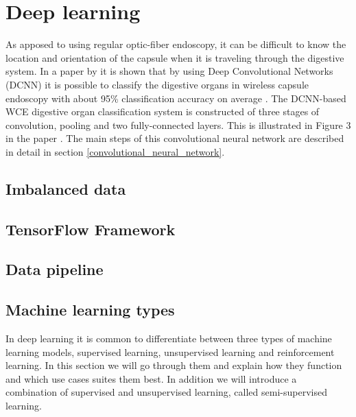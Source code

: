 \documentclass[thesis.tex]{subfiles}
\begin{document}



\section{Deep learning} \label{sec:deep_learning}
As apposed to using regular optic-fiber endoscopy, it can be difficult to know the location and orientation of the capsule when it is traveling through the digestive system. In a paper by \citeauthor*{ClassifyingDigestive15} it is shown that by using Deep Convolutional Networks (DCNN) it is possible to classify the digestive organs in wireless capsule endoscopy with about 95\% classification accuracy on average \cite{ClassifyingDigestive15}.
The DCNN-based WCE digestive organ classification system is constructed of three stages of convolution, pooling and two fully-connected layers. This is illustrated in Figure 3 in the paper \cite{ClassifyingDigestive15}. The main steps of this convolutional neural network are described in detail in section \ref{convolutional_neural_network}.

\subsection{Imbalanced data}

\subsection{TensorFlow Framework} %
\subsection{Data pipeline} %


\subsection{Machine learning types} \label{sec:machine_learning_types}
In deep learning it is common to differentiate between three types of machine learning models, supervised learning, unsupervised learning and reinforcement learning. In this section we will go through them and explain how they function and which use cases suites them best. In addition we will introduce a combination of supervised and unsupervised learning, called semi-supervised learning.
\end{document}
